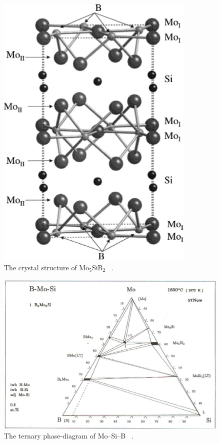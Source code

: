  
%
\vspace{8mm}
\begin{figure}[H]
\begin{center}
\includegraphics[width=9.5cm]{t2structure}
\caption{The crystal structure of Mo$_5$SiB$_2$ ~\cite{sakidja08}. }
\label{fig:T2structure}
\end{center}
\end{figure}
\vspace{-.2cm}
%
%
\begin{figure}[H]
\begin{center}
\includegraphics[width=\textwidth]{MoSiB_1600}
\caption{The ternary phase-diagram of Mo--Si--B ~\cite{nowotny57}.}
\label{fig:MoSiB_1600}
\end{center}
\end{figure}
